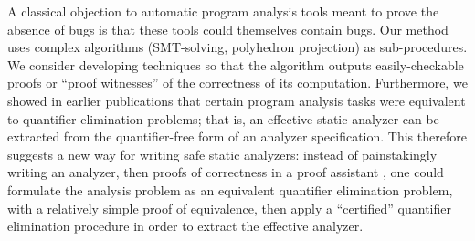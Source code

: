 A classical objection to automatic program analysis tools meant to prove the absence of bugs is that these tools could themselves contain bugs. Our method uses complex algorithms (SMT-solving, polyhedron projection) as sub-procedures. We consider developing techniques so that the algorithm outputs easily-checkable proofs or ``proof witnesses'' of the correctness of its computation. Furthermore, we showed in earlier publications \cite{Monniaux_SAS07} that certain program analysis tasks were equivalent to quantifier elimination problems; that is, an effective static analyzer can be extracted from the quantifier-free form of an analyzer specification. This therefore suggests a new way for writing safe static analyzers: instead of painstakingly writing an analyzer, then proofs of correctness in a proof assistant \cite{Pich:these}, one could formulate the analysis problem as an equivalent quantifier elimination problem, with a relatively simple proof of equivalence, then apply a ``certified'' quantifier elimination procedure in order to extract the effective analyzer.


